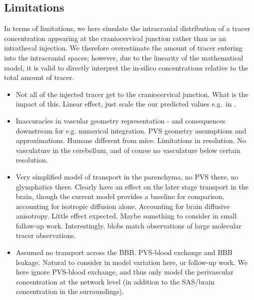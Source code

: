 \documentclass[fleqn,10pt]{wlscirep}
\begin{document}

\subsection*{Limitations}

In terms of limitations, we here simulate the intracranial
distribution of a tracer concentration appearing at the craniocervical
junction rather than as an intrathecal injection. We therefore
overestimate the amount of tracer entering into the intracranial
spaces; however, due to the linearity of the mathematical model, it is
valid to directly interpret the in-silico concentrations relative to
the total amount of tracer.

\begin{itemize}
\item
  Not all of the injected tracer get to the craniocervical
  junction. What is the impact of this. Linear effect, just scale the
  our predicted values e.g.~in .
\item 
  Inaccuracies in vascular geometry representation - and consequences
  downstream for e.g. numerical integration. PVS geometry assumptions
  and approximations. Humans different from mice. Limitations in
  resolution. No vasculature in the cerebellum, and of course no
  vasculature below certain resolution.
\item
  Very simplified model of transport in the parenchyma, no PVS there,
  no glymphatics there. Clearly have an effect on the later stage
  transport in the brain, though the current model provides a baseline
  for comparison, accounting for isotropic diffusion alone.
  Accounting for brain diffusive anisotropy. Little effect
  expected. Maybe something to consider in small follow-up
  work. Interestingly, blobs match observations of large molecular
  tracer observations.
\item
  Assumed no transport across the BBB. PVS-blood exchange and BBB
  leakage. Natural to consider in model variation here, or follow-up
  work. We here ignore PVS-blood exchange, and thus only model the
  perivascular concentration at the network level (in addition to the
  SAS/brain concentration in the surroundings).
\end{itemize}
\end{document}
